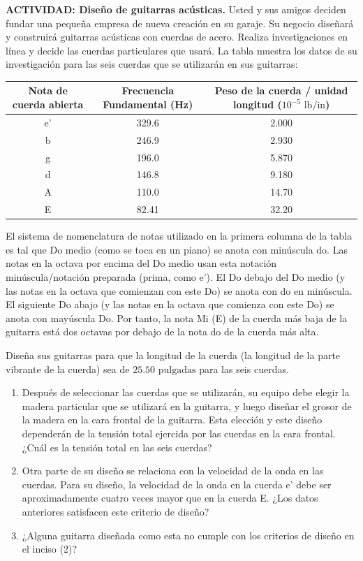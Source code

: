 \item \textbf{ACTIVIDAD: Diseño de guitarras acústicas.}
Usted y sus amigos deciden fundar una pequeña empresa de nueva creación en su garaje. Su negocio diseñará y construirá guitarras acústicas con cuerdas de acero. Realiza investigaciones en línea y decide las cuerdas particulares que usará. La tabla muestra los datos de su investigación para las seis cuerdas que se utilizarán en sus guitarras:

\begin{center}
\begin{tabular}{|c|c|c|}
\hline
\textbf{Nota de cuerda abierta} & \textbf{Frecuencia Fundamental (Hz)} & \textbf{Peso de la cuerda / unidad longitud ($10^{-5}\text{ lb/in}$)} \\ \hline
e' & 329.6 & 2.000 \\ \hline
b & 246.9 & 2.930 \\ \hline
g & 196.0 & 5.870 \\ \hline
d & 146.8 & 9.180 \\ \hline
A & 110.0 & 14.70 \\ \hline
E & 82.41 & 32.20 \\ \hline
\end{tabular}
\end{center}

El sistema de nomenclatura de notas utilizado en la primera columna de la tabla es tal que Do medio (como se toca en un piano) se anota con minúscula do. Las notas en la octava por encima del Do medio usan esta notación minúscula/notación preparada (prima, como e'). El Do debajo del Do medio (y las notas en la octava que comienzan con este Do) se anota con do en minúscula. El siguiente Do abajo (y las notas en la octava que comienza con este Do) se anota con mayúscula Do. Por tanto, la nota Mi (E) de la cuerda más baja de la guitarra está dos octavas por debajo de la nota do de la cuerda más alta.

Diseña sus guitarras para que la longitud de la cuerda (la longitud de la parte vibrante de la cuerda) sea de $25.50\text{ pulgadas}$ para las seis cuerdas.
\begin{enumerate}
    \item Después de seleccionar las cuerdas que se utilizarán, su equipo debe elegir la madera particular que se utilizará en la guitarra, y luego diseñar el grosor de la madera en la cara frontal de la guitarra. Esta elección y este diseño dependerán de la tensión total ejercida por las cuerdas en la cara frontal. ¿Cuál es la tensión total en las seis cuerdas?
    \item Otra parte de su diseño se relaciona con la velocidad de la onda en las cuerdas. Para su diseño, la velocidad de la onda en la cuerda e' debe ser aproximadamente cuatro veces mayor que en la cuerda E. ¿Los datos anteriores satisfacen este criterio de diseño?
    \item ¿Alguna guitarra diseñada como esta no cumple con los criterios de diseño en el inciso (2)?
\end{enumerate}